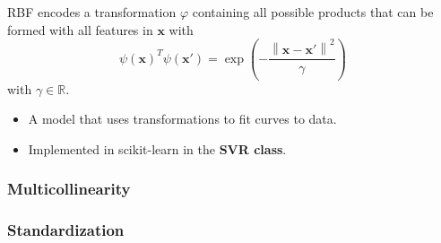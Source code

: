 
RBF encodes a transformation $\varphi$ containing all possible products that can be formed with all features in $\mathbf{x}$ with
\begin{equation*}
    {\psi(\mathbf{x})}^T\psi(\mathbf{x}')=\exp\left(-\frac{\left\|\mathbf{x}-\mathbf{x}'\right\|^{2}}{\gamma}\right)
\end{equation*}
with $\gamma \in \mathbb{R}$.


\begin{itemize}
    \item A model that uses transformations to fit curves to data.
    \item Implemented in scikit-learn in the \textbf{SVR class}.
\end{itemize}


\subsubsection{Multicollinearity}

\subsubsection{Standardization}

